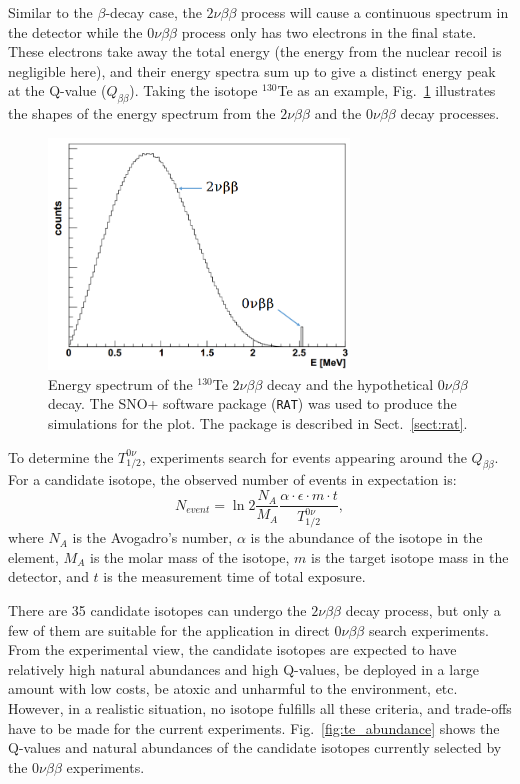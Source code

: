 Similar to the $\beta$-decay case, the $2\nu\beta\beta$ process will cause a continuous spectrum in the detector while the $0\nu\beta\beta$ process only has two electrons in the final state. These electrons take away the total energy (the energy from the nuclear recoil is negligible here), and their energy spectra sum up to give a distinct energy peak at the Q-value ($Q_{\beta\beta}$). Taking the isotope $^{130}$Te as an example, Fig.~\ref{te130energy} illustrates the shapes of the energy spectrum from the $2\nu\beta\beta$ and the $0\nu\beta\beta$ decay processes.
\begin{figure}[htbp]
	\centering	
	\includegraphics[width=8cm]{Te130_energy0vbb.png}
	\caption[Energy spectrum of the $^{130}$Te $2\nu\beta\beta$ decay and the hypothetical $0\nu\beta\beta$ decay.]{Energy spectrum of the $^{130}$Te $2\nu\beta\beta$ decay and the hypothetical $0\nu\beta\beta$ decay. The SNO+ software package (\texttt{RAT}) was used to produce the simulations for the plot. The package is described in Sect.~\ref{sect:rat}.}
	\label{te130energy}
\end{figure}

To determine the $T^{0\nu}_{1/2}$, experiments search for events appearing around the $Q_{\beta\beta}$. For a candidate isotope, the observed number of events in expectation is: 
\begin{equation}
N_{event} = \ln 2 \frac{N_A}{M_A}\frac{\alpha\cdot\epsilon\cdot m\cdot t}{T^{0\nu}_{1/2}},
\end{equation}
where $N_A$ is the Avogadro's number, $\alpha$ is the abundance of the isotope in the element, $M_A$ is the molar mass of the isotope, $m$ is the target isotope mass in the detector, and $t$ is the measurement time of total exposure.

There are 35 candidate isotopes can undergo the $2\nu\beta\beta$ decay process, but only a few of them are suitable for the application in direct $0\nu\beta\beta$ search experiments\cite{giunti2007fundamentals}. From the experimental view, the candidate isotopes are expected to have relatively high natural abundances and high Q-values, be deployed in a large amount with low costs, be atoxic and unharmful to the environment, etc. However, in a realistic situation, no isotope fulfills all these criteria, and trade-offs have to be made for the current experiments\cite{dolinski2019neutrinoless}. Fig.~\ref{fig:te_abundance} shows the Q-values and natural abundances of the candidate isotopes currently selected by the $0\nu\beta\beta$ experiments.

